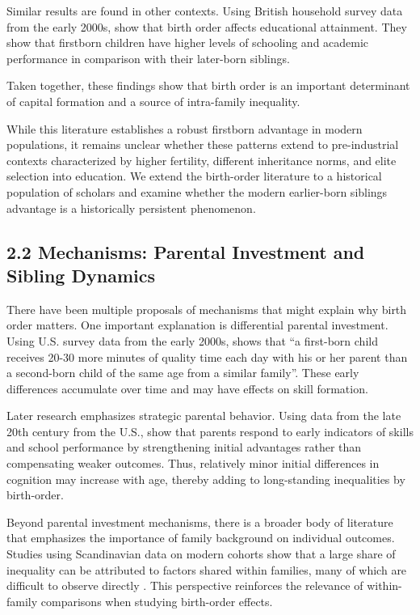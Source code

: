 Similar results are found in other contexts. Using British household survey data from the early 2000s, \cite{Booth2009} show that birth order affects educational attainment. They show that firstborn children have higher levels of schooling and academic performance in comparison with their later-born siblings.

Taken together, these findings show that birth order is an important determinant of capital formation and a source of intra-family inequality. 

While this literature establishes a robust firstborn advantage in modern populations, it remains unclear whether these patterns extend to pre-industrial contexts characterized by higher fertility, different inheritance norms, and elite selection into education. We extend the birth-order literature to a historical population of scholars and examine whether the modern earlier-born siblings advantage is a historically persistent phenomenon.

\subsection*{2.2 Mechanisms: Parental Investment and Sibling Dynamics}

There have been multiple proposals of mechanisms that might explain why birth order matters. One important explanation is differential parental investment. Using U.S. survey data from the early 2000s, \cite{Price2008} shows that ``a first-born child  receives 20-30 more minutes of quality time each day with his or her parent than a second-born child of the same age from a similar family''. These early differences accumulate over time and may have effects on skill formation.

Later research emphasizes strategic parental behavior. Using data from the late 20th century from the U.S., \citet{Hotz2015} show that parents respond to early indicators of skills and school performance by strengthening initial advantages rather than compensating weaker outcomes. Thus, relatively minor initial differences in cognition may increase with age, thereby adding to long-standing inequalities by birth-order.

Beyond parental investment mechanisms, there is a broader body of literature that emphasizes the importance of family background on individual outcomes. Studies using Scandinavian data on modern cohorts show that a large share of inequality can be attributed to factors shared within families, many of which are difficult to observe directly \citep{bjorklund2020intergenerational}. This perspective reinforces the relevance of within-family comparisons when studying birth-order effects.

